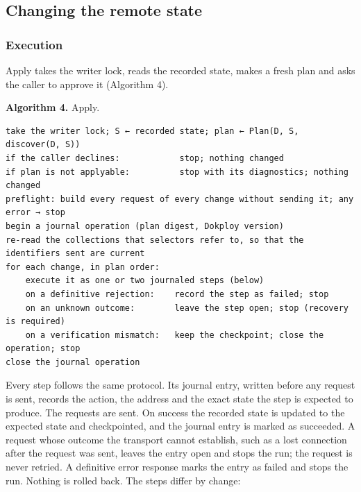 \subsection{Changing the remote state}\label{sec:6.3}

\subsubsection*{Execution}

Apply takes the writer lock, reads the recorded state, makes a fresh plan and asks the caller to
approve it (Algorithm 4).

\textbf{Algorithm 4.} Apply.

\begin{lstlisting}
take the writer lock; S ← recorded state; plan ← Plan(D, S, discover(D, S))
if the caller declines:            stop; nothing changed
if plan is not applyable:          stop with its diagnostics; nothing changed
preflight: build every request of every change without sending it; any error → stop
begin a journal operation (plan digest, Dokploy version)
re-read the collections that selectors refer to, so that the identifiers sent are current
for each change, in plan order:
    execute it as one or two journaled steps (below)
    on a definitive rejection:    record the step as failed; stop
    on an unknown outcome:        leave the step open; stop (recovery is required)
    on a verification mismatch:   keep the checkpoint; close the operation; stop
close the journal operation
\end{lstlisting}

Every step follows the same protocol. Its journal entry, written before any request is sent, records
the action, the address and the exact state the step is expected to produce. The requests are sent.
On success the recorded state is updated to the expected state and checkpointed, and the journal entry
is marked as succeeded. A request whose outcome the transport cannot establish, such as a lost
connection after the request was sent, leaves the entry open and stops the run; the request is never
retried. A definitive error response marks the entry as failed and stops the run. Nothing is rolled
back. The steps differ by change:

